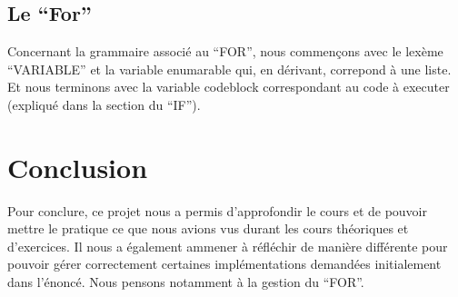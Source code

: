 \documentclass[10pt,a4paper]{article}
\begin{document}
	\subsection{Le ``For''}
	Concernant la grammaire associé au ``FOR'', nous commençons avec le lexème ``VARIABLE'' et la variable enumarable qui, en dérivant, correpond à une liste.
	Et nous terminons avec la variable codeblock correspondant au code à executer (expliqué dans la section du ``IF'').
	\\
	\section{Conclusion}
	Pour conclure, ce projet nous a permis d'approfondir le cours et de pouvoir mettre le pratique ce que nous avions vus durant les cours théoriques 
	et d'exercices. Il nous a également ammener à réfléchir de manière différente pour pouvoir gérer correctement certaines implémentations demandées
	initialement dans l'énoncé. Nous pensons notamment à la gestion du ``FOR''.
	
\end{document}
